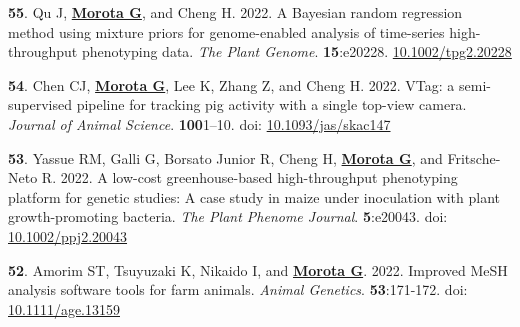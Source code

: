 \documentclass[margin,line,10pt]{res}
\newenvironment{list1}{
  \begin{list}{\ding{113}}{%
      \setlength{\itemsep}{0in}
      \setlength{\parsep}{0in} \setlength{\parskip}{0in}
      \setlength{\topsep}{0in} \setlength{\partopsep}{0in} 
      \setlength{\leftmargin}{0.17in}}}{\end{list}}
\begin{document}
\begin{resume}
\begin{list1}
        
         
        \vspace{0.5cm}

  \item  [{\bf 55}.] Qu J, \textbf{\underline{Morota G}}, and Cheng H. 2022. A Bayesian random regression method using mixture priors for genome-enabled analysis of time-series high-throughput phenotyping data. \emph{The Plant Genome}. \textbf{15}:e20228. \textcolor{blue}{\href{https://doi.org/10.1002/tpg2.20228}{10.1002/tpg2.20228}}    

  \vspace{0.5cm}


\item [{\bf 54}.]  Chen CJ, \textbf{\underline{Morota G}}, Lee K, Zhang Z, and Cheng H. 2022. VTag: a semi-supervised pipeline for tracking pig activity with a single top-view camera. \emph{Journal of Animal Science}. \textbf{100}1–10. doi: \textcolor{blue}{\href{https://doi.org/10.1093/jas/skac147}{10.1093/jas/skac147}}  

    \vspace{0.5cm}


\item [{\bf 53}.] Yassue RM, Galli G, Borsato Junior R, Cheng H, \textbf{\underline{Morota G}}, and Fritsche-Neto R. 2022. A low-cost greenhouse-based high-throughput phenotyping platform for genetic studies: A case study in maize under inoculation with plant growth-promoting bacteria. \emph{The Plant Phenome Journal}. \textbf{5}:e20043. doi: \textcolor{blue}{\href{https://doi.org/10.1002/ppj2.20043}{10.1002/ppj2.20043}}  
  
  \vspace{0.5cm}

             
\item [{\bf 52}.] Amorim ST, Tsuyuzaki K, Nikaido I, and \textbf{\underline{Morota G}}. 2022. Improved MeSH analysis software tools for farm animals.  \emph{Animal Genetics}. \textbf{53}:171-172. doi: \textcolor{blue}{\href{https://doi.org/10.1111/age.13159}{10.1111/age.13159}} 

\end{list1}





\section{}
\begin{list1}


\end{list1}
\end{resume}
\end{document}
